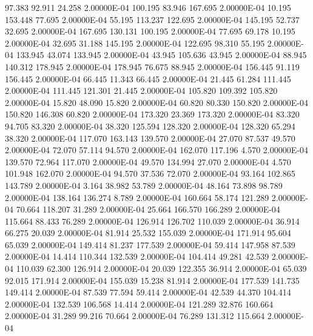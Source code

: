     97.383    92.911    24.258  2.00000E-04
   100.195    83.946   167.695  2.00000E-04
    10.195   153.448    77.695  2.00000E-04
    55.195   113.237   122.695  2.00000E-04
   145.195    52.737    32.695  2.00000E-04
   167.695   130.131   100.195  2.00000E-04
    77.695    69.178    10.195  2.00000E-04
    32.695    31.188   145.195  2.00000E-04
   122.695    98.310    55.195  2.00000E-04
   133.945    43.074   133.945  2.00000E-04
    43.945   105.636    43.945  2.00000E-04
    88.945   140.312   178.945  2.00000E-04
   178.945    76.675    88.945  2.00000E-04
   156.445    91.119   156.445  2.00000E-04
    66.445    11.343    66.445  2.00000E-04
    21.445    61.284   111.445  2.00000E-04
   111.445   121.301    21.445  2.00000E-04
   105.820   109.392   105.820  2.00000E-04
    15.820    48.090    15.820  2.00000E-04
    60.820    80.330   150.820  2.00000E-04
   150.820   146.308    60.820  2.00000E-04
   173.320    23.369   173.320  2.00000E-04
    83.320    94.705    83.320  2.00000E-04
    38.320   125.594   128.320  2.00000E-04
   128.320    65.294    38.320  2.00000E-04
   117.070   163.143   139.570  2.00000E-04
    27.070    87.537    49.570  2.00000E-04
    72.070    57.114    94.570  2.00000E-04
   162.070   117.196     4.570  2.00000E-04
   139.570    72.964   117.070  2.00000E-04
    49.570   134.994    27.070  2.00000E-04
     4.570   101.948   162.070  2.00000E-04
    94.570    37.536    72.070  2.00000E-04
    93.164   102.865   143.789  2.00000E-04
     3.164    38.982    53.789  2.00000E-04
    48.164    73.898    98.789  2.00000E-04
   138.164   136.274     8.789  2.00000E-04
   160.664    58.174   121.289  2.00000E-04
    70.664   118.207    31.289  2.00000E-04
    25.664   166.570   166.289  2.00000E-04
   115.664    88.433    76.289  2.00000E-04
   126.914   126.702   110.039  2.00000E-04
    36.914    66.275    20.039  2.00000E-04
    81.914    25.532   155.039  2.00000E-04
   171.914    95.604    65.039  2.00000E-04
   149.414    81.237   177.539  2.00000E-04
    59.414   147.958    87.539  2.00000E-04
    14.414   110.344   132.539  2.00000E-04
   104.414    49.281    42.539  2.00000E-04
   110.039    62.300   126.914  2.00000E-04
    20.039   122.355    36.914  2.00000E-04
    65.039    92.015   171.914  2.00000E-04
   155.039    15.238    81.914  2.00000E-04
   177.539   141.735   149.414  2.00000E-04
    87.539    77.594    59.414  2.00000E-04
    42.539    44.370   104.414  2.00000E-04
   132.539   106.568    14.414  2.00000E-04
   121.289    32.876   160.664  2.00000E-04
    31.289    99.216    70.664  2.00000E-04
    76.289   131.312   115.664  2.00000E-04
